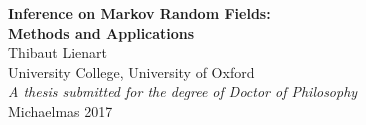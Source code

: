 
\begin{center}
{\Large\bfseries Inference on Markov Random Fields:\\[.2cm]
Methods and Applications}\\[1cm]
{\large Thibaut Lienart}\\[.3cm]
University College, University of Oxford\\[1cm]
\emph{A thesis submitted for the degree of Doctor of Philosophy}\\[.3cm]
Michaelmas 2017\\[1.5cm]

{\large\bfseries {}}
\end{center}

